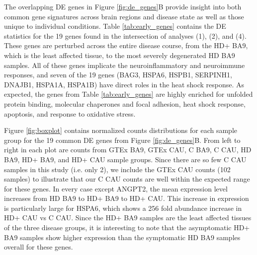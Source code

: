 \documentclass[fleqn,10pt,table]{wlscirep}
\begin{document}
The overlapping DE genes in Figure \ref{fig:de_genes}B provide insight into both common gene signatures across brain regions and disease state as well as those unique to individual conditions.
Table \ref{tab:early_genes} contains the DE statistics for the 19 genes found in the intersection of analyses (1), (2), and (4).
These genes are perturbed across the entire disease course, from the HD+ BA9, which is the least affected tissue, to the most severely degenerated HD BA9 samples.
All of these genes implicate the neuroinflammatory and neuroimmune responses, and seven of the 19 genes (BAG3, HSPA6, HSPB1, SERPINH1, DNAJB1, HSPA1A, HSPA1B) have direct roles in the heat shock response.
As expected, the genes from Table \ref{tab:early_genes} are highly enriched for unfolded protein binding, molecular chaperones and focal adhesion, heat shock response, apoptosis, and response to oxidative stress.

Figure \ref{fig:boxplot} contains normalized counts distributions for each sample group for the 19 common DE genes from Figure \ref{fig:de_genes}B.
From left to right in each plot are counts from GTEx BA9, GTEx CAU, C BA9, C CAU, HD BA9, HD+ BA9, and HD+ CAU sample groups.
Since there are so few C CAU samples in this study (i.e. only 2), we include the GTEx CAU counts (102 samples) to illustrate that our C CAU counts are well within the expected range for these genes.
In every case except ANGPT2, the mean expression level increases from HD BA9 to HD+ BA9 to HD+ CAU.
This increase in expression is particularly large for HSPA6, which shows a 256 fold abundance increase in HD+ CAU vs C CAU.
Since the HD+ BA9 samples are the least affected tissues of the three disease groups, it is interesting to note that the asymptomatic HD+ BA9 samples show higher expression than the symptomatic HD BA9 samples overall for these genes.
\end{document}
